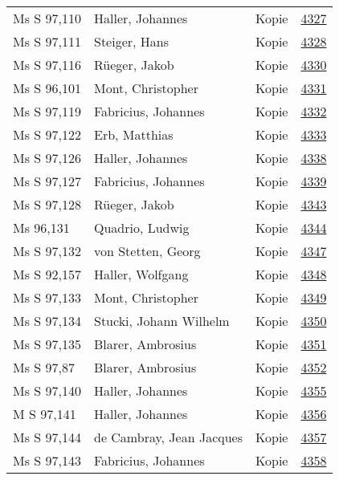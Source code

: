 \documentclass[10pt,a4paper,landscape]{report}
\begin{document}
\begin{longtable}{p{16cm}p{4cm}lr}
Ms S 97,110	&	Haller, Johannes	&	Kopie	&	\href{http://130.60.24.72/assignment/4327}{4327}\\
Ms S 97,111	&	Steiger, Hans	&	Kopie	&	\href{http://130.60.24.72/assignment/4328}{4328}\\
Ms S 97,116	&	Rüeger, Jakob	&	Kopie	&	\href{http://130.60.24.72/assignment/4330}{4330}\\
Ms S 96,101	&	Mont, Christopher	&	Kopie	&	\href{http://130.60.24.72/assignment/4331}{4331}\\
Ms S 97,119	&	Fabricius, Johannes	&	Kopie	&	\href{http://130.60.24.72/assignment/4332}{4332}\\
Ms S 97,122	&	Erb, Matthias	&	Kopie	&	\href{http://130.60.24.72/assignment/4333}{4333}\\
Ms S 97,126	&	Haller, Johannes	&	Kopie	&	\href{http://130.60.24.72/assignment/4338}{4338}\\
Ms S 97,127	&	Fabricius, Johannes	&	Kopie	&	\href{http://130.60.24.72/assignment/4339}{4339}\\
Ms S 97,128	&	Rüeger, Jakob	&	Kopie	&	\href{http://130.60.24.72/assignment/4343}{4343}\\
Ms 96,131	&	Quadrio, Ludwig	&	Kopie	&	\href{http://130.60.24.72/assignment/4344}{4344}\\
Ms S 97,132	&	von Stetten, Georg	&	Kopie	&	\href{http://130.60.24.72/assignment/4347}{4347}\\
Ms S 92,157	&	Haller, Wolfgang	&	Kopie	&	\href{http://130.60.24.72/assignment/4348}{4348}\\
Ms S 97,133	&	Mont, Christopher	&	Kopie	&	\href{http://130.60.24.72/assignment/4349}{4349}\\
Ms S 97,134	&	Stucki, Johann Wilhelm	&	Kopie	&	\href{http://130.60.24.72/assignment/4350}{4350}\\
Ms S 97,135	&	Blarer, Ambrosius	&	Kopie	&	\href{http://130.60.24.72/assignment/4351}{4351}\\
Ms S 97,87	&	Blarer, Ambrosius	&	Kopie	&	\href{http://130.60.24.72/assignment/4352}{4352}\\
Ms S 97,140	&	Haller, Johannes	&	Kopie	&	\href{http://130.60.24.72/assignment/4355}{4355}\\
M S 97,141	&	Haller, Johannes	&	Kopie	&	\href{http://130.60.24.72/assignment/4356}{4356}\\
Ms S 97,144	&	de Cambray, Jean Jacques	&	Kopie	&	\href{http://130.60.24.72/assignment/4357}{4357}\\
Ms S 97,143	&	Fabricius, Johannes	&	Kopie	&	\href{http://130.60.24.72/assignment/4358}{4358}\\

\end{longtable}
\end{document}
